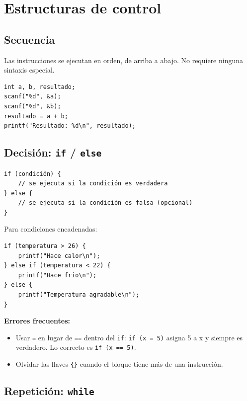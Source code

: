 \section{Estructuras de control}

\subsection{Secuencia}

Las instrucciones se ejecutan en orden, de arriba a abajo. No requiere ninguna sintaxis especial.

\begin{lstlisting}[style=estilo-c]
int a, b, resultado;
scanf("%d", &a);
scanf("%d", &b);
resultado = a + b;
printf("Resultado: %d\n", resultado);
\end{lstlisting}

\subsection{Decisión: \texttt{if} / \texttt{else}}

\begin{lstlisting}[style=estilo-c]
if (condición) {
    // se ejecuta si la condición es verdadera
} else {
    // se ejecuta si la condición es falsa (opcional)
}
\end{lstlisting}

Para condiciones encadenadas:

\begin{lstlisting}[style=estilo-c]
if (temperatura > 26) {
    printf("Hace calor\n");
} else if (temperatura < 22) {
    printf("Hace frio\n");
} else {
    printf("Temperatura agradable\n");
}
\end{lstlisting}

\begin{advertenciabox}
\textbf{Errores frecuentes:}
\begin{itemize}
    \item Usar \texttt{=} en lugar de \texttt{==} dentro del \texttt{if}: \texttt{if (x = 5)} asigna 5 a x y siempre es verdadero. Lo correcto es \texttt{if (x == 5)}.
    \item Olvidar las llaves \texttt{\{\}} cuando el bloque tiene más de una instrucción.
\end{itemize}
\end{advertenciabox}

\subsection{Repetición: \texttt{while}}


